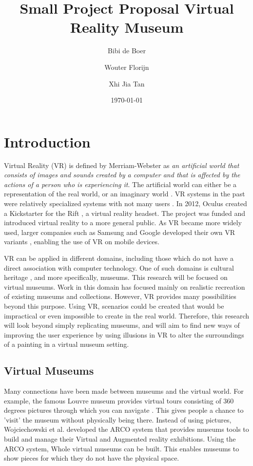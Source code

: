 \documentclass[a4paper]{article}
\title{Small Project Proposal Virtual Reality Museum}
\author{Bibi de Boer \and Wouter Florijn \and Xhi Jia Tan}
\date{\today}
\begin{document}
\maketitle

\section{Introduction}

Virtual Reality (VR) is defined by Merriam-Webster \cite{merriam} as \emph{an artificial world that consists of images and sounds created by a computer and that is affected by the actions of a person who is experiencing it}. The artificial world can either be a representation of the real world, or an imaginary world \cite{martens}. VR systems in the past were relatively specialized systems with not many users \cite{martens}. In 2012, Oculus created a Kickstarter \cite{kickstarter} for the Rift \cite{oculus}, a virtual reality headset. The project was funded and  introduced virtual reality to a more general public. As VR became more widely used, larger companies such as Samsung and Google developed their own VR variants \cite{gearvr, cardboard}, enabling the use of VR on mobile devices. 

VR can be applied in different domains, including those which do not have a direct association with computer technology. One of such domains is cultural heritage \cite{wojciechowski}, and more specifically, museums. This research will be focused on virtual museums. Work in this domain has focused mainly on realistic recreation of existing museums and collections. However, VR provides many possibilities beyond this purpose. Using VR, scenarios could be created that would be impractical or even impossible to create in the real world. Therefore, this research will look beyond simply replicating museums, and will aim to find new ways of improving the user experience by using illusions in VR to alter the surroundings of a painting in a virtual museum setting.


\subsection{Virtual Museums}
Many connections have been made between museums and the virtual  world. For example, the famous Louvre museum provides virtual tours consisting of 360 degrees pictures through which you can navigate \cite{louvre}. This gives people a chance to 'visit' the museum without physically being there. Instead of using pictures, Wojciechowski et al. \cite{wojciechowski} developed the ARCO system that provides museums tools to build and manage their Virtual and Augmented reality exhibitions. Using the ARCO system, Whole virtual museums can be built. This enables museums to show pieces for which they do not have the physical space. 
\end{document}
